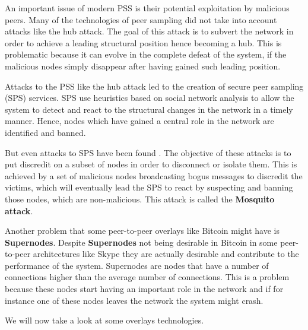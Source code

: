 An important issue of modern PSS is their potential exploitation by malicious peers. Many of the technologies of peer sampling did not take into account attacks like the hub attack. The goal of this attack is to subvert the network in order to achieve a leading structural position hence becoming a hub. This is problematic because it can evolve in the complete defeat of the system, if the malicious nodes simply disappear after having gained such leading position.

Attacks to the PSS like the hub attack led to the creation of secure peer sampling (SPS) services. SPS use heuristics based on social network analysis to allow the system to detect and react to the structural changes in the network in a timely manner. Hence, nodes which have gained a central role in the network are identified and banned.

But even attacks to SPS have been found \cite{jesi2009secure}. The objective of these attacks is to put discredit on a subset of nodes in order to disconnect or isolate them. This is achieved by a set of malicious nodes broadcasting bogus messages to discredit the victims, which will eventually lead the SPS to react by suspecting and banning those nodes, which are non-malicious. This attack is called the \textbf{Mosquito attack}.

Another problem that some peer-to-peer overlays like Bitcoin might have is \textbf{Supernodes}. Despite \textbf{Supernodes}  not being desirable in Bitcoin in some peer-to-peer architectures like Skype they are actually desirable and contribute to the performance of the system. Supernodes are nodes that have a number of connections higher than the average number of connections. This is a problem because these nodes start having an important role in the network and if for instance one of these nodes leaves the network the system might crash.

We will now take a look at some overlays technologies.

